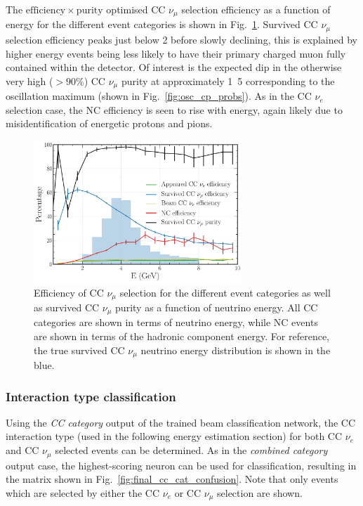 The $\mathrm{efficiency}\times\mathrm{purity}$ optimised CC $\nu_{\mu}$ selection efficiency as a
function of energy for the different event categories is shown in Fig.~\ref{fig:final_numu_hists}.
Survived CC $\nu_{\mu}$ selection efficiency peaks just below \unit{2}{\GeV} before slowly
declining, this is explained by higher energy events being less likely to have their primary
charged muon fully contained within the detector. Of interest is the expected dip in the otherwise
very high ($>90\%$) CC $\nu_{\mu}$ purity at approximately \unit{1.5}{\GeV} corresponding to the
oscillation maximum (shown in Fig.~\ref{fig:osc_cp_probs}). As in the CC $\nu_{e}$ selection case,
the NC efficiency is seen to rise with energy, again likely due to misidentification of energetic
protons and pions.

\begin{figure} %
    \includegraphics[width=0.7\textwidth]{diagrams/7-results/final_numu_hists.pdf}
    \caption[Efficiency of CC $\nu_{\mu}$ selection as a function of energy]
    {Efficiency of CC $\nu_{\mu}$ selection for the different event categories as well as survived
        CC $\nu_{\mu}$ purity as a function of neutrino energy. All CC categories are shown in
        terms of neutrino energy, while NC events are shown in terms of the hadronic component
        energy. For reference, the true survived CC $\nu_{\mu}$ neutrino energy distribution is
        shown in the blue.}
    \label{fig:final_numu_hists}
\end{figure}

\subsubsection*{Interaction type classification} %

Using the \emph{CC category} output of the trained beam classification network, the CC interaction
type (used in the following energy estimation section) for both CC $\nu_{e}$ and CC $\nu_{\mu}$
selected events can be determined. As in the \emph{combined category} output case, the
highest-scoring neuron can be used for classification, resulting in the matrix shown in
Fig.~\ref{fig:final_cc_cat_confusion}. Note that only events which are selected by either the CC
$\nu_{e}$ or CC $\nu_{\mu}$ selection are shown.

